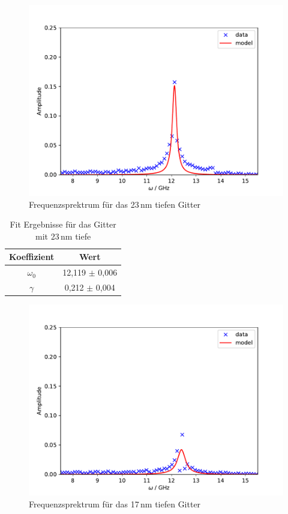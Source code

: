 \begin{figure}[h!]
 	\centering
 	\includegraphics[width=\textwidth]{img/005_a000_b0_e245_G4fft.pdf}
 	\caption{Frequenzsprektrum für das 23\,nm tiefen Gitter}
 	\label{abb:film}
\end{figure}

\begin{table}[h!]
 \centering
\begin{tabular}{cc}
    Koeffizient & Wert \\
	\midrule
 	$\omega_0$ & 12,119 $\pm$ 0,006 \\
 	$\gamma$ & 0,212 $\pm$ 0,004 \\
\end{tabular}
\caption{Fit Ergebnisse für das Gitter mit 23\,nm tiefe}
\label{tab:fit}
\end{table}


\begin{figure}[h!]
 	\centering
 	\includegraphics[width=\textwidth]{img/006_a000_b0_e245_G3fft.pdf}
 	\caption{Frequenzsprektrum für das 17\,nm tiefen Gitter}
 	\label{abb:film}
\end{figure}

